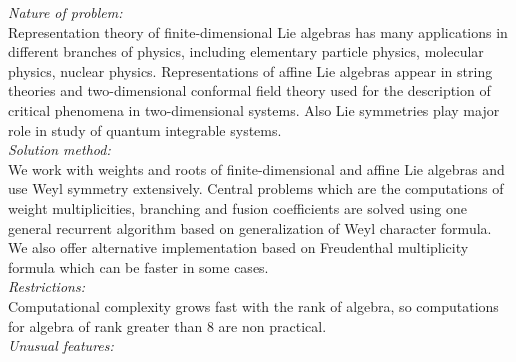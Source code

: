 \documentclass[preprint,12pt]{elsarticle}
\begin{document}
\begin{small}
{\em Nature of problem:}\\
Representation theory of finite-dimensional Lie algebras has many applications in different branches of physics, including elementary particle physics, molecular physics, nuclear physics. Representations of affine Lie algebras appear in string theories and two-dimensional conformal field theory used for the description of critical phenomena in two-dimensional systems. Also Lie symmetries play major role in study of quantum integrable systems.
   \\
{\em Solution method:}\\
We work with weights and roots of finite-dimensional and affine Lie algebras and use Weyl symmetry extensively. Central problems which are the computations of weight multiplicities, branching and fusion coefficients are solved using one general recurrent algorithm based on generalization of Weyl character formula. We also offer alternative implementation based on Freudenthal multiplicity formula which can be faster in some cases.
   \\
{\em Restrictions:}\\
Computational complexity grows fast  with the rank of algebra, so computations for algebra of rank greater than 8 are non practical.
   \\
{\em Unusual features:}\\

\end{small}
\end{document}
